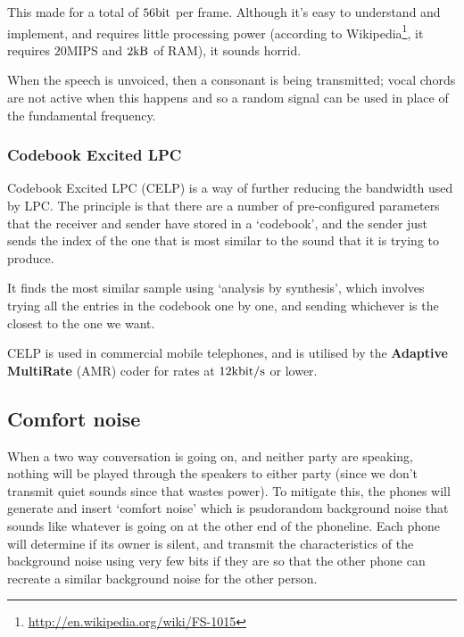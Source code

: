 
This made for a total of $56\si{\bit}$ per frame. Although it's easy to
understand and implement, and requires little processing power (according to
Wikipedia\footnote{\url{http://en.wikipedia.org/wiki/FS-1015}}, it requires
$20$MIPS and $2\si{\kilo\byte}$ of RAM), it sounds horrid.

When the speech is unvoiced, then a consonant is being transmitted; vocal chords
are not active when this happens and so a random signal can be used in place of
the fundamental frequency.

\subsubsection{Codebook Excited LPC}

Codebook Excited LPC (CELP) is a way of further reducing the bandwidth used by
LPC. The principle is that there are a number of pre-configured parameters that
the receiver and sender have stored in a `codebook', and the sender just sends
the index of the one that is most similar to the sound that it is trying to
produce.

It finds the most similar sample using `analysis by synthesis', which involves
trying all the entries in the codebook one by one, and sending whichever is the
closest to the one we want. 

\label{amr}

CELP is used in commercial mobile telephones, and is utilised by the
\textbf{Adaptive MultiRate} (AMR) coder for rates at
$12\si{\kilo\bit\per\second}$ or lower.

\subsection{Comfort noise}

When a two way conversation is going on, and neither party are speaking, nothing
will be played through the speakers to either party (since we don't transmit
quiet sounds since that wastes power). To mitigate this, the phones will
generate and insert `comfort noise' which is psudorandom background noise that
sounds like whatever is going on at the other end of the phoneline. Each phone
will determine if its owner is silent, and transmit the characteristics of the
background noise using very few bits if they are so that the other phone can
recreate a similar background noise for the other person.

